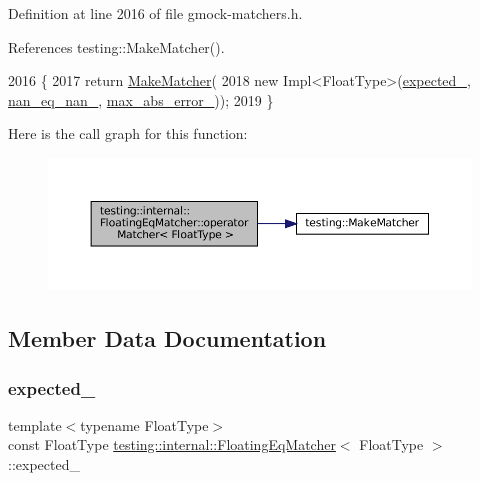Definition at line 2016 of file gmock-\/matchers.\+h.



References testing\+::\+Make\+Matcher().


\begin{DoxyCode}
2016                                       \{
2017     \textcolor{keywordflow}{return} \hyperlink{namespacetesting_a37fd8029ac00e60952440a3d9cca8166}{MakeMatcher}(
2018         \textcolor{keyword}{new} Impl<FloatType>(\hyperlink{classtesting_1_1internal_1_1FloatingEqMatcher_a01d4d3ee6344cd3d88c53dd6e730b9df}{expected\_}, \hyperlink{classtesting_1_1internal_1_1FloatingEqMatcher_a782b06cb55b4989c3c67facf910265bf}{nan\_eq\_nan\_}, 
      \hyperlink{classtesting_1_1internal_1_1FloatingEqMatcher_a06b3fd6f9ee60bc694a12ccaeba2924a}{max\_abs\_error\_}));
2019   \}
\end{DoxyCode}
Here is the call graph for this function\+:
\nopagebreak
\begin{figure}[H]
\begin{center}
\leavevmode
\includegraphics[width=350pt]{classtesting_1_1internal_1_1FloatingEqMatcher_abd377dfafd89bdb7effdd80989aeee80_cgraph}
\end{center}
\end{figure}


\subsection{Member Data Documentation}
\mbox{\label{classtesting_1_1internal_1_1FloatingEqMatcher_a01d4d3ee6344cd3d88c53dd6e730b9df}} 
\subsubsection{\texorpdfstring{expected\+\_\+}{expected\_}}
{\footnotesize\ttfamily template$<$typename Float\+Type$>$ \\
const Float\+Type \hyperlink{classtesting_1_1internal_1_1FloatingEqMatcher}{testing\+::internal\+::\+Floating\+Eq\+Matcher}$<$ Float\+Type $>$\+::expected\+\_\+\hspace{0.3cm}{\ttfamily [private]}}



